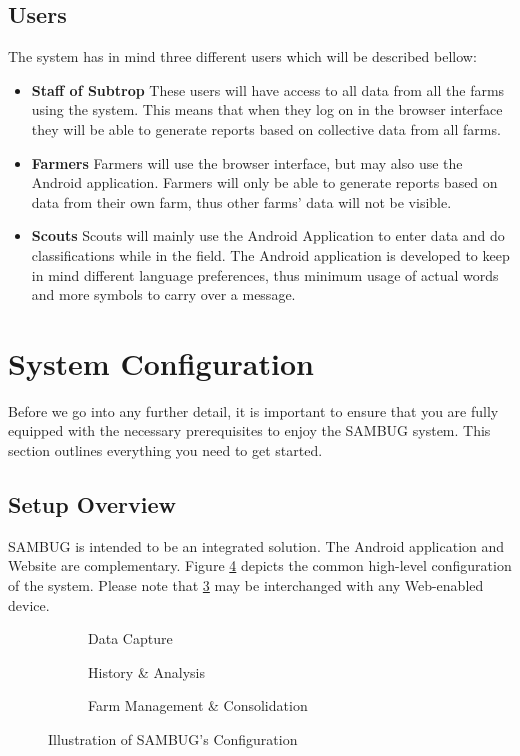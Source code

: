 \documentclass[11pt,a4paper,titlepage]{article}
\begin{document}
\subsection{Users}
The system has in mind three different users which will be described bellow:
	\begin{itemize}
		\item \textbf{Staff of Subtrop} These users will have access to all data from all the farms using the system. This means that when they log on in the browser interface they will be able to generate reports based on collective data from all farms.
		\item \textbf{Farmers} Farmers will use the browser interface, but may also use the Android application. Farmers will only be able to generate reports based on data from their own farm, thus other farms' data will not be visible. 
		\item \textbf{Scouts} Scouts will mainly use the Android Application to enter data and do classifications while in the field. The Android application is developed to keep in mind different language preferences, thus minimum usage of actual words and more symbols to carry over a message.
	\end{itemize}



\section{System Configuration}
Before we go into any further detail, it is important to ensure that you are fully equipped with the necessary prerequisites to enjoy the SAMBUG system. This section outlines everything you need to get started.
\subsection{Setup Overview}
SAMBUG is intended to be an integrated solution. The Android application and Website are complementary. Figure \ref{fig:layout} depicts the common high-level configuration of the system. Please note that \ref{fig:Web} may be interchanged with any Web-enabled device.
	\begin{figure}[h]
		\begin{subfigure}{0.3\textwidth}
		\caption{Data Capture}		
		\label{fig:dataCapt}	
		\end{subfigure}
		\begin{subfigure}{0.3\textwidth}
		\caption{History \& Analysis}		
		\label{fig:Engine}	
		\end{subfigure}
		\begin{subfigure}{0.3\textwidth}
		\caption{Farm Management \& Consolidation}	
		\label{fig:Web}		
		\end{subfigure}
	\caption{Illustration of SAMBUG's Configuration}
	\label{fig:layout}
	\end{figure}
\end{document}
